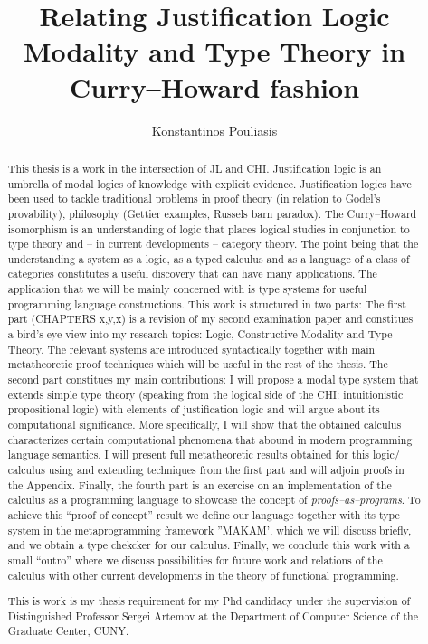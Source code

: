 \documentclass[12pt]{report}
\title{Relating Justification Logic Modality and Type Theory in Curry--Howard fashion}
\author{Konstantinos Pouliasis}
\begin{document}
\maketitle


\begin{abstract}
This thesis is a work in the intersection of \ac{JL} and \ac{CHI}. Justification logic is an umbrella of modal logics of knowledge with explicit evidence. 
Justification logics have been used to tackle traditional problems in proof theory (in relation to Godel's provability), philosophy (Gettier examples, Russels barn paradox). 
The Curry--Howard isomorphism is an understanding of logic that places logical studies in conjunction to type theory and -- in current developments -- 
category theory. The point being that the  understanding a system as a logic, as a typed calculus and as a language of a class of categories constitutes a useful discovery 
that can have many applications.
The application that we will be mainly concerned with is type systems for useful programming language constructions. 
This work  is structured in two parts: 
The first part (CHAPTERS x,y,x) is a revision of my second examination paper and constitues a bird's eye view into my research topics:  
Logic, Constructive Modality and Type Theory. 
The relevant systems are introduced syntactically together with main  metatheoretic proof techniques which will be useful in the rest of the thesis.
The second part constitues my main contributions: I will propose  a modal type system that extends simple type theory (speaking from the logical side of the \ac{CHI}: 
intuitionistic propositional logic) with elements of justification logic and will argue about its computational significance. More specifically, I will show  
that the obtained calculus characterizes  certain computational phenomena that abound in modern programming language semantics. 
I will present full metatheoretic
results obtained for this logic/ calculus using and extending techniques from the first part and will adjoin proofs in the Appendix.
Finally, the fourth part is an exercise
on an implementation of the calculus as a programming language to showcase the concept of \emph{proofs--as--programs}. To achieve this ``proof of concept'' result we define our 
language together with its type system
in the metaprogramming framework ''MAKAM', which we will discuss briefly, and we obtain a type chekcker for our calculus. Finally, we conclude this work with a small ``outro'' 
where we discuss possibilities for future work and relations of the calculus with other current developments in the theory of functional programming.

This is work is my thesis requirement for my Phd candidacy under the supervision of Distinguished Professor Sergei Artemov at the Department of 
Computer Science of the Graduate Center, CUNY.
\end{abstract}
\tableofcontents










\nocite{Pfenning2009a, Pfenning2009b}




\end{document}
